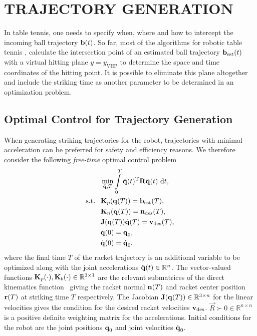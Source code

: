 \section{TRAJECTORY GENERATION}\label{method}
%
In table tennis, one needs to specify when, where and how to intercept the incoming ball trajectory $\boldsymbol{\mathrm{b}}(t)$. So far, most of the algorithms for robotic table tennis \cite{Matsushima05}, \cite{Muelling13} calculate the intersection point of an estimated ball trajectory $\boldsymbol{\mathrm{b}}_{\mathrm{est}}(t)$ with a virtual hitting plane $y = y_{\mathrm{VHP}}$ to determine the space and time coordinates of the hitting point. It is possible to eliminate this plane altogether and include the striking time as another parameter to be determined in an optimization problem.
%
\subsection{Optimal Control for Trajectory Generation}
%
When generating striking trajectories for the robot, trajectories with minimal acceleration can be preferred for safety and efficiency reasons. We therefore consider the following \emph{free-time} optimal control problem~\cite{Liberzon11}
%
\begin{align}
&\min_{\ddot{\boldsymbol{\mathrm{q}}},T} \int\limits_{0}^{T}\ddot{\boldsymbol{\mathrm{q}}}(t)^{\mathrm{T}}\boldsymbol{\mathrm{R}}\ddot{\boldsymbol{\mathrm{q}}}(t) \ \mathrm{d}t, \label{costFnc1} \\
\textrm{s.t. \ } & \boldsymbol{\mathrm{K}}_p(\boldsymbol{\mathrm{q}}(T)) = \boldsymbol{\mathrm{b}}_{\mathrm{est}}(T), \label{transCond1} \\
& \boldsymbol{\mathrm{K}}_n(\boldsymbol{\mathrm{q}}(T)) = \boldsymbol{\mathrm{n}}_{\mathrm{des}}(T), \label{transCond2}\\
&\boldsymbol{\mathrm{J}}(\boldsymbol{\mathrm{q}}(T))\dot{\boldsymbol{\mathrm{q}}}(T) = \boldsymbol{\mathrm{v}}_{\mathrm{des}}(T), \label{transCond3} \\
&\boldsymbol{\mathrm{q}}(0) = \boldsymbol{\mathrm{q}}_{0}, \label{initCond1} \\
&\dot{\boldsymbol{\mathrm{q}}}(0) = \dot{\boldsymbol{\mathrm{q}}}_{0}, \label{initCond2}
\end{align}
%
\noindent where the final time $T$ of the racket trajectory is an additional variable to be optimized along with the joint accelerations $\ddot{\boldsymbol{\mathrm{q}}}(t) \in \mathbb{R}^{n}$. The vector-valued functions $\boldsymbol{\mathrm{K}}_p(\cdot), \boldsymbol{\mathrm{K}}_b(\cdot) \in \mathbb{R}^{3 \times 1}$ are the relevant submatrices of the direct kinematics function~\cite{Spong06} giving the racket normal $\boldsymbol{\mathrm{n}}(T)$ and racket center position $\boldsymbol{\mathrm{r}}(T)$ at striking time $T$ respectively. The Jacobian $\boldsymbol{\mathrm{J}}(\boldsymbol{\mathrm{q}}(T)) \in \mathbb{R}^{3 \times n}$ for the linear velocities gives the condition for the desired racket velocities $\boldsymbol{\mathrm{v}}_{\mathrm{des}}$. $\vec{R} \succ 0 \in \mathbb{R}^{n \times n}$ is a positive definite weighting matrix for the accelerations. Initial conditions for the robot are the joint positions $\boldsymbol{\mathrm{q}}_0$ and joint velocities $\dot{\boldsymbol{\mathrm{q}}}_0$.

